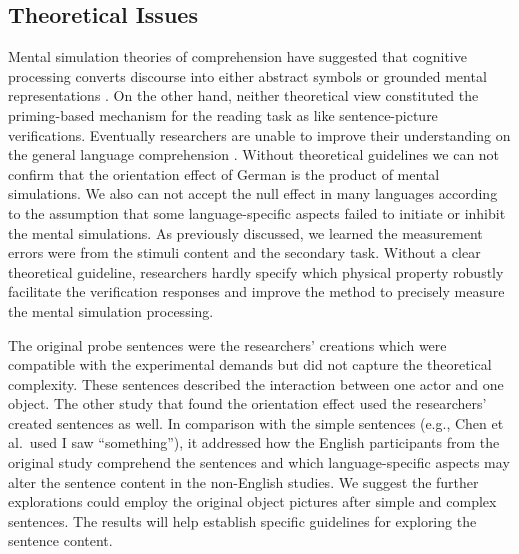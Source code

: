\documentclass[
  man,floatsintext]{apa6}
\begin{document}
\hypertarget{theoretical-issues}{%
\subsection{Theoretical Issues}\label{theoretical-issues}}

Mental simulation theories of comprehension have suggested that cognitive processing converts discourse into either abstract symbols or grounded mental representations \autocite{barsalouPerceptualSymbolSystems1999,barsalouSimulationSituatedConceptualization2009,zwaan_embodiment_2014}. On the other hand, neither theoretical view constituted the priming-based mechanism for the reading task as like sentence-picture verifications. Eventually researchers are unable to improve their understanding on the general language comprehension \autocite{kaschakEmbodimentLabTheory2021}. Without theoretical guidelines we can not confirm that the orientation effect of German is the product of mental simulations. We also can not accept the null effect in many languages according to the assumption that some language-specific aspects failed to initiate or inhibit the mental simulations. As previously discussed, we learned the measurement errors were from the stimuli content and the secondary task. Without a clear theoretical guideline, researchers hardly specify which physical property robustly facilitate the verification responses and improve the method to precisely measure the mental simulation processing.

The original probe sentences \autocites[see][]{stanfield_effect_2001,zwaanRevisitingMentalSimulation2012} were the researchers' creations which were compatible with the experimental demands but did not capture the theoretical complexity. These sentences described the interaction between one actor and one object. The other study \autocite{chenDoesObjectSize2020} that found the orientation effect used the researchers' created sentences as well. In comparison with the simple sentences (e.g., Chen et al.~used I saw ``something''), it addressed how the English participants from the original study comprehend the sentences and which language-specific aspects may alter the sentence content in the non-English studies. We suggest the further explorations could employ the original object pictures after simple and complex sentences. The results will help establish specific guidelines for exploring the sentence content.
\end{document}
